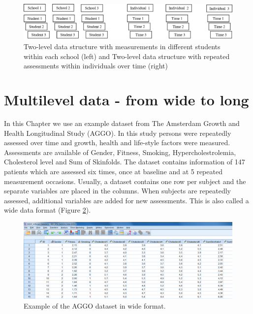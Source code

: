 \documentclass[]{book}
\theoremstyle{definition}
\theoremstyle{definition}
\theoremstyle{definition}
\theoremstyle{remark}
\begin{document}
\begin{figure}

{\centering \includegraphics[width=0.9\linewidth]{images/fig7.1} 

}

\caption{Two-level data structure with measurements in different students within each school (left) and Two-level data structure with repeated assessments within individuals over time (right)}\label{fig:fig71}
\end{figure}

\section{Multilevel data - from wide to
long}\label{multilevel-data---from-wide-to-long-1}

In this Chapter we use an example dataset from The Amsterdam Growth and
Health Longitudinal Study (AGGO). In this study persons were repeatedly
assessed over time and growth, health and life-style factors were
measured. Assessments are available of Gender, Fitness, Smoking,
Hypercholestrolemia, Cholesterol level and Sum of Skinfolds. The dataset
contains information of 147 patients which are assessed six times, once
at baseline and at 5 repeated measurement occasions. Usually, a dataset
contains one row per subject and the separate variables are placed in
the columns. When subjects are repeatedly assessed, additional variables
are added for new assessments. This is also called a wide data format
(Figure \ref{fig:fig72}).

\begin{figure}

{\centering \includegraphics[width=0.9\linewidth]{images/fig7.2} 

}

\caption{Example of the AGGO dataset in wide format.}\label{fig:fig72}
\end{figure}
\end{document}
